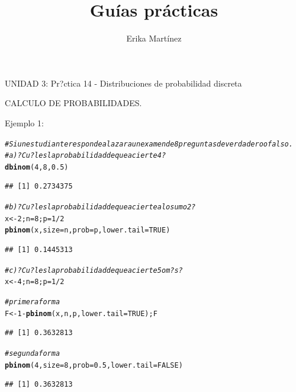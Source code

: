 \documentclass[10pt,a4paper]{article}\usepackage[]{graphicx}\usepackage[]{color}
\author{Erika Martínez}
\title{Guías prácticas}
\makeatletter
\newcommand{\hlnum}[1]{\textcolor[rgb]{0.686,0.059,0.569}{#1}}%
\newcommand{\hlcom}[1]{\textcolor[rgb]{0.678,0.584,0.686}{\textit{#1}}}%
\newcommand{\hlopt}[1]{\textcolor[rgb]{0,0,0}{#1}}%
\newcommand{\hlstd}[1]{\textcolor[rgb]{0.345,0.345,0.345}{#1}}%
\newcommand{\hlkwb}[1]{\textcolor[rgb]{0.69,0.353,0.396}{#1}}%
\newcommand{\hlkwc}[1]{\textcolor[rgb]{0.333,0.667,0.333}{#1}}%
\newcommand{\hlkwd}[1]{\textcolor[rgb]{0.737,0.353,0.396}{\textbf{#1}}}%
\newenvironment{kframe}{%
 \def\at@end@of@kframe{}%
 \ifinner\ifhmode%
  \def\at@end@of@kframe{\end{minipage}}%
  \begin{minipage}{\columnwidth}%
 \fi\fi%
 \def\FrameCommand##1{\hskip\@totalleftmargin \hskip-\fboxsep
 \colorbox{shadecolor}{##1}\hskip-\fboxsep
     \hskip-\linewidth \hskip-\@totalleftmargin \hskip\columnwidth}%
 \MakeFramed {\advance\hsize-\width
   \@totalleftmargin\z@ \linewidth\hsize
   \@setminipage}}%
 {\par\unskip\endMakeFramed%
 \at@end@of@kframe}
\newenvironment{knitrout}{}{} %
\makeatother
\begin{document}
\maketitle
\newpage

UNIDAD 3: Pr?ctica 14 - Distribuciones de probabilidad discreta 

CALCULO DE PROBABILIDADES.

Ejemplo 1:
\begin{knitrout}
\color{fgcolor}\begin{kframe}
\begin{alltt}
\hlcom{#Si un estudiante responde al azar a un examen de 8 preguntas de verdadero o falso. }
\hlcom{#a) ?Cu?l es la probabilidad de que acierte 4?}
\hlkwd{dbinom}\hlstd{(}\hlnum{4}\hlstd{,}\hlnum{8}\hlstd{,}\hlnum{0.5}\hlstd{)}
\end{alltt}
\begin{verbatim}
## [1] 0.2734375
\end{verbatim}
\begin{alltt}
\hlcom{#b) ?Cu?l es la probabilidad de que acierte a lo sumo 2?}
\hlstd{x} \hlkwb{<-} \hlnum{2}\hlstd{; n}\hlkwb{=}\hlnum{8}\hlstd{; p}\hlkwb{=}\hlnum{1}\hlopt{/}\hlnum{2}
\hlkwd{pbinom}\hlstd{(x,} \hlkwc{size} \hlstd{= n,} \hlkwc{prob} \hlstd{= p,} \hlkwc{lower.tail}\hlstd{=}\hlnum{TRUE}\hlstd{)}
\end{alltt}
\begin{verbatim}
## [1] 0.1445313
\end{verbatim}
\begin{alltt}
\hlcom{#c) ?Cu?l es la probabilidad de que acierte 5 o m?s?}
\hlstd{x} \hlkwb{<-} \hlnum{4}\hlstd{; n}\hlkwb{=}\hlnum{8}\hlstd{; p}\hlkwb{=}\hlnum{1}\hlopt{/}\hlnum{2}

\hlcom{#primera forma }
\hlstd{F} \hlkwb{<-} \hlnum{1} \hlopt{-} \hlkwd{pbinom}\hlstd{(x, n, p,} \hlkwc{lower.tail}\hlstd{=}\hlnum{TRUE}\hlstd{); F}
\end{alltt}
\begin{verbatim}
## [1] 0.3632813
\end{verbatim}
\begin{alltt}
\hlcom{#segunda forma }
\hlkwd{pbinom}\hlstd{(}\hlnum{4}\hlstd{,} \hlkwc{size}\hlstd{=}\hlnum{8}\hlstd{,} \hlkwc{prob}\hlstd{=}\hlnum{0.5}\hlstd{,} \hlkwc{lower.tail}\hlstd{=}\hlnum{FALSE}\hlstd{)}
\end{alltt}
\begin{verbatim}
## [1] 0.3632813
\end{verbatim}
\end{kframe}
\end{knitrout}
\end{document}
